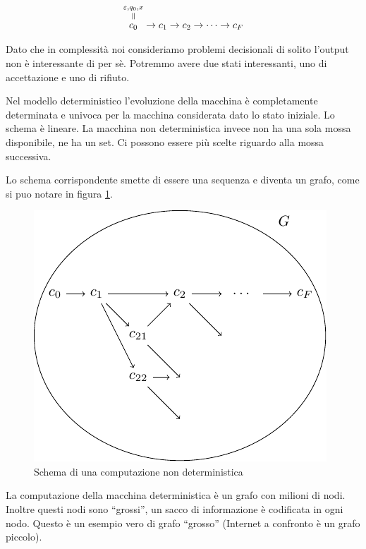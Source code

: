 \begin{equation*}
    \overequalto{c_{0}}{\varepsilon,q_{0},x} \to c_{1} \to c_{2} \to \cdots \to c_{F}
\end{equation*}

Dato che in complessità noi consideriamo problemi decisionali di solito l'output non è
interessante di per sè. Potremmo avere due stati interessanti, uno di accettazione e uno di
rifiuto.

Nel modello deterministico l'evoluzione della macchina è completamente determinata e univoca per la
macchina considerata dato lo stato iniziale. Lo schema è lineare. La macchina non deterministica
invece non ha una sola mossa disponibile, ne ha un set. Ci possono essere più scelte riguardo alla
mossa successiva.

Lo schema corrispondente smette di essere una sequenza e diventa un grafo, come si puo notare in
figura \ref{img:nondetcomp}.

\begin{figure}[h]
    \begin{center}
        \includegraphics{./img/deterministic_complexity_classes/NonDetComputation.pdf}
        \caption{Schema di una computazione non deterministica}
        \label{img:nondetcomp}
    \end{center}
\end{figure}

La computazione della macchina deterministica è un grafo con milioni di nodi. Inoltre questi nodi
sono ``grossi'', un sacco di informazione è codificata in ogni nodo. Questo è un esempio vero di
grafo ``grosso'' (Internet a confronto è un grafo piccolo).

